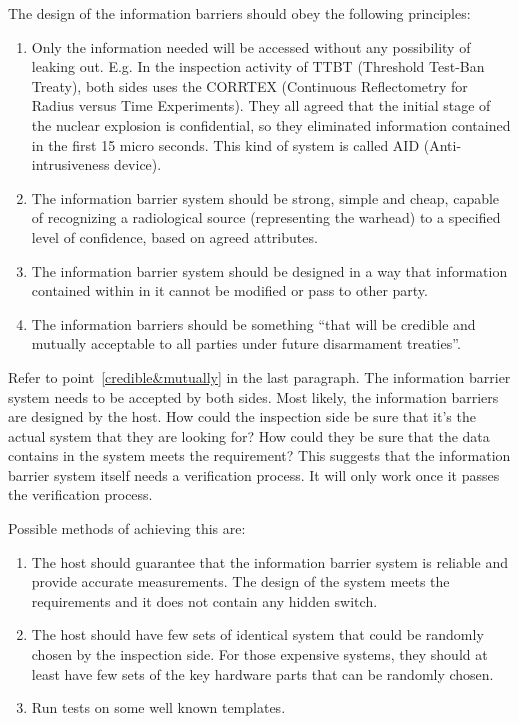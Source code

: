 \documentclass[twoside,titlepage,11pt,twocolumn,a4paper]{article}
\begin{document}
The design of the information barriers should obey the following
principles: 
\begin{enumerate}
  \item Only the information needed will be accessed without any
    possibility of leaking out. E.g. In the inspection activity of
    TTBT (Threshold Test-Ban Treaty), both sides uses the CORRTEX
    (Continuous Reflectometry for Radius versus Time
    Experiments). \citep{deupree1981} They all agreed that the initial
    stage of the nuclear explosion is confidential, so they eliminated
    information contained in the first 15 micro seconds. This kind of
    system is called AID (Anti-intrusiveness device).
  \item The information barrier system should be strong, simple and
    cheap, capable of recognizing a radiological source (representing
    the warhead) to a specified level of confidence, based on agreed
    attributes.
  \item The information barrier system should be designed in a way
    that information contained within in it cannot be modified or pass
    to other party.
  \item \label{credible&mutually}The information barriers should be
    something ``that will be credible and mutually acceptable to all
    parties under future disarmament treaties''. \citep{shultz2007}
\end{enumerate}

Refer to point~\ref{credible&mutually} in the last paragraph. The
information barrier system needs to be accepted by both sides. Most
likely, the information barriers are designed by the host. How could
the inspection side be sure that it's the actual system that they are
looking for? How could they be sure that the data contains in the
system meets the requirement? This suggests that the information
barrier system itself needs a verification process. It will only work
once it passes the verification process.

Possible methods of achieving this are:
\begin{enumerate}
  \item The host should guarantee that the information barrier system
    is reliable and provide accurate measurements. The design of the
    system meets the requirements and it does not contain any hidden
    switch.
  \item The host should have few sets of identical system that could
    be randomly chosen by the inspection side. For those expensive
    systems, they should at least have few sets of the key hardware
    parts that can be randomly chosen.
  \item Run tests on some well known templates.
\end{enumerate}
\end{document}
